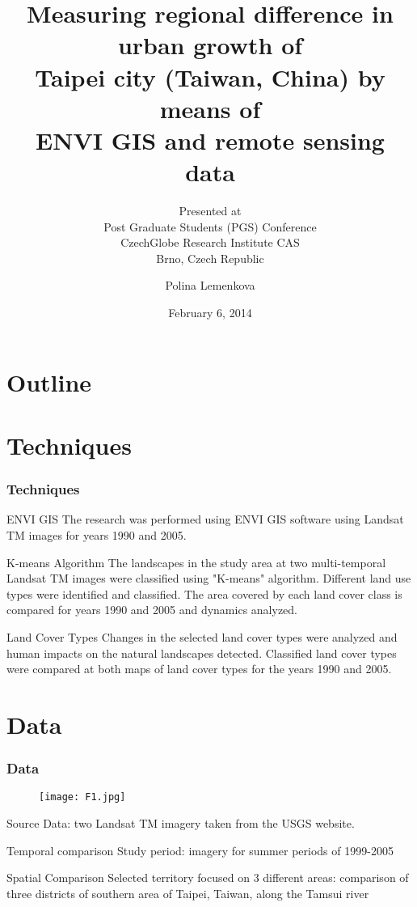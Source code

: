 \documentclass[pdflatex,compress,8pt,
	xcolor={dvipsnames,dvipsnames,svgnames,x11names,table},
	hyperref={colorlinks = true,breaklinks = true, urlcolor = NavyBlue, breaklinks = true}]{beamer}
\title[Measuring regional difference in urban growth of Taipei city (Taiwan, China) by ENVI GIS]{Measuring regional difference in urban growth of \\
Taipei city (Taiwan, China) by means of \\ENVI GIS and
remote sensing data}
\subtitle{\vspace*{0.5cm}Presented at \\
Post Graduate Students (PGS) Conference \\
CzechGlobe Research Institute CAS\\
Brno, Czech Republic}
\author{Polina Lemenkova}
\date{February 6, 2014}
\begin{document}
\begin{frame}
           \titlepage
\end{frame}

\section*{Outline}
\begin{frame}
        \scriptsize{   \tableofcontents}
\end{frame}

\section{Techniques}
\begin{frame}\frametitle{Techniques}

\begin{alertblock}{ENVI GIS}
The research was performed using ENVI GIS software using Landsat TM images for years 1990 and 2005.
\end{alertblock}

\begin{block}{K-means Algorithm}
The landscapes in the study area at two multi-temporal Landsat TM images were classified using "K-means" algorithm. Different land use types were identified and classified. The area covered by each land cover class is compared for years 1990 and 2005 and dynamics analyzed.
\end{block}

\begin{block}{Land Cover Types}
Changes in the selected land cover types were analyzed and human impacts on the natural landscapes detected. Classified land cover types were compared at both maps of land cover types for the years 1990 and 2005.
\end{block}

\end{frame}

\section{Data}
\begin{frame}\frametitle{Data}
\begin{figure}[H]
	\centering
		\texttt{[image: F1.jpg]}
\end{figure}

\begin{alertblock}{Source}
Data: two Landsat TM imagery taken from the USGS website. 
\end{alertblock}

\begin{block}{Temporal comparison}
Study period: imagery for summer periods of 1999-2005 
\end{block}

\begin{examples}{Spatial Comparison}
Selected territory focused on \alert{3 different areas}: comparison of three districts of southern area of Taipei, Taiwan, along the Tamsui river
\end{examples} 
\end{frame}
\end{document}

